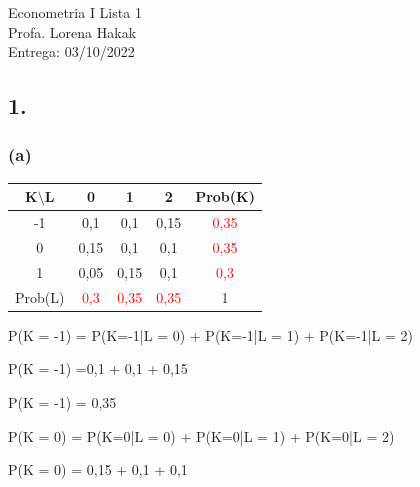 \documentclass[hidelinks,11pt]{book}
\theoremstyle{definition}
\begin{document}
	
	
	\begin{center}
		{\Large Econometria I \hspace{0.5cm} Lista 1}\\
		Profa. Lorena Hakak\\
		Entrega: 03/10/2022
	\end{center}
	
	\vspace{0.2 cm}
	
	
	\subsection*{1.}

\subsubsection{(a)}

	\begin{center}
	\begin{tabular}{|c|c|c|c|c|}\hline
		K$\setminus$L & 0 & 1 & 2 & Prob(K)\\\hline
		-1 & 0,1 & 0,1 & 0,15 & \textcolor{red}{0,35}\\\hline
		0 & 0,15 & 0,1 & 0,1 & \textcolor{red}{0,35}\\\hline
		1 & 0,05 & 0,15& 0,1 & \textcolor{red}{0,3}\\\hline
		Prob(L) & \textcolor{red}{0,3} &\textcolor{red}{0,35}& \textcolor{red}{0,35} & 1\\\hline
	\end{tabular}
\end{center}


\begin{center}
	P(K = -1) = P(K=-1|L = 0) + P(K=-1|L = 1) + P(K=-1|L = 2)
\end{center}

\begin{center}
	P(K = -1) =0,1 + 0,1 + 0,15
\end{center}

\begin{center}
	P(K = -1) = 0,35
\end{center}

\begin{center}
	P(K = 0) = P(K=0|L = 0) + P(K=0|L = 1) + P(K=0|L = 2)
\end{center}

\begin{center}
	P(K = 0) = 0,15 + 0,1 + 0,1
\end{center}
\end{document}
